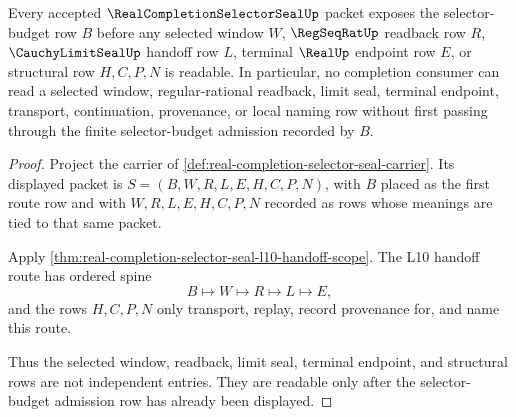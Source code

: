 \begin{theorem}
\label{thm:real-completion-selector-seal-selector-budget-totality}
Every accepted $\RealCompletionSelectorSealUp$ packet exposes the selector-budget row $B$ before any selected window $W$, $\RegSeqRatUp$ readback row $R$, $\CauchyLimitSealUp$ handoff row $L$, terminal $\RealUp$ endpoint row $E$, or structural row $H,C,P,N$ is readable. In particular, no completion consumer can read a selected window, regular-rational readback, limit seal, terminal endpoint, transport, continuation, provenance, or local naming row without first passing through the finite selector-budget admission recorded by $B$.
\end{theorem}
\begin{proof}
Project the carrier of \autoref{def:real-completion-selector-seal-carrier}. Its displayed packet is $S=(B,W,R,L,E,H,C,P,N)$, with $B$ placed as the first route row and with $W,R,L,E,H,C,P,N$ recorded as rows whose meanings are tied to that same packet.

Apply \autoref{thm:real-completion-selector-seal-l10-handoff-scope}. The L10 handoff route has ordered spine
$$
B \longmapsto W \longmapsto R \longmapsto L \longmapsto E,
$$
and the rows $H,C,P,N$ only transport, replay, record provenance for, and name this route.

Thus the selected window, readback, limit seal, terminal endpoint, and structural rows are not independent entries. They are readable only after the selector-budget admission row has already been displayed.
\end{proof}

